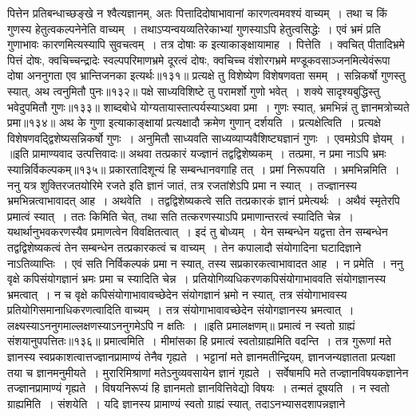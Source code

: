 पित्तेन प्रतिबन्धाच्छङ्खे न श्वैत्यज्ञानम्, अतः पित्तादिदोषाभावानां कारणत्वमवश्यं वाच्यम्~। तथा च किं गुणस्य हेतुत्वकल्पनेनेति वाच्यम्~। तथाऽप्यन्वयव्यतिरेकाभ्यां
गुणस्याऽपि हेतुत्वसिद्धेः~। एवं भ्रमं प्रति गुणाभावः कारणमित्यस्यापि सुवचत्वम्~।
तत्र दोषाः क इत्याकाङ्क्षायामाह~। पित्तेति~। क्वचित् पीतादिभ्रमे पित्तं दोषः, क्वचिच्चन्द्रादेः स्वल्पपरिमाणभ्रमे दूरत्वं दोषः, क्वचिच्च वंशोरगभ्रमे मण्डूकवसाञ्जनमित्येवंरूपा
दोषा अननुगता एव भ्रान्तिजनका इत्यर्थः॥१३१॥
प्रत्यक्षे तु विशेष्येण विशेषणवता समम्~।
सन्निकर्षो गुणस्तु स्यात्, अथ त्वनुमितौ पुनः॥१३२॥
पक्षे साध्यविशिष्टे तु परामर्शो गुणो भवेत्~।
शक्ये सादृश्यबुद्धिस्तु भवेदुपमितौ गुणः॥१३३॥
शाब्दबोधे योग्यतायास्तात्पर्यस्याऽथवा प्रमा~।
गुणः स्यात्, भ्रमभिन्नं तु ज्ञानमत्रोच्यते प्रमा॥१३४॥
अथ के गुणा इत्याकाङ्क्षायां प्रत्यक्षादौ क्रमेण गुणान् दर्शयति~। प्रत्यक्षेत्विति~। प्रत्यक्षे विशेषणवद्द्विशेष्यसन्निकर्षो गुणः~।
अनुमितौ साध्यवति साध्यव्याप्यवैशिष्ट्यज्ञानं गुणः~। एवमग्रेऽपि ज्ञेयम्~।
॥इति प्रामाण्यवाद उत्पत्तिवादः॥
अथवा तत्प्रकारं यज्ज्ञानं तद्वद्विशेष्यकम्~।
तत्प्रमा, न प्रमा नाऽपि भ्रमः स्यान्निर्विकल्पकम्॥१३५॥
प्रकारतादिशून्यं हि सम्बन्धानवगाहि तत्~।
प्रमां निरूपयति~। भ्रमभिन्नमिति~।
ननु यत्र शुक्तिरजतयोरिमे रजते इति ज्ञानं जातं, तत्र रजतांशेऽपि प्रमा न स्यात्~। तज्ज्ञानस्य भ्रमभिन्नत्वाभावादत् आह~। अथवेति~। तद्वद्विशेष्यकत्वे सति तत्प्रकारकं
ज्ञानं प्रमेत्यर्थः~। अथैवं स्मृतेरपि प्रमात्वं स्यात्~। ततः किमिति चेत्, तथा सति तत्करणस्याऽपि प्रमाणान्तरत्वं स्यादिति चेन्न~। यथार्थानुभवकरणस्यैव प्रमाणत्वेन
विवक्षितत्वात्~।
इदं तु बोध्यम्~। येन सम्बन्धेन यद्वत्ता तेन सम्बन्धेन तद्वद्विशेष्यकत्वं तेन सम्बन्धेन तत्प्रकारकत्वं च वाच्यम्~। तेन कपालादौ संयोगादिना घटादिज्ञाने
नाऽतिव्याप्तिः~।
एवं सति निर्विकल्पकं प्रमा न स्यात्, तस्य सप्रकारकत्वाभावादत आह~। न प्रमेति~। ननु वृक्षे कपिसंयोगज्ञानं भ्रमः प्रमा च स्यादिति चेन्न~।
प्रतियोगिव्यधिकरणकपिसंयोगाभाववति संयोगज्ञानस्य भ्रमत्वात्~। न च वृक्षे कपिसंयोगाभावावच्छेदेन संयोगज्ञानं भ्रमो न स्यात्, तत्र संयोगाभावस्य प्रतियोगिसमानाधिकरणत्वादिति
वाच्यम्~। तत्र संयोगाभावावच्छेदेन संयोगज्ञानस्य भ्रमत्वात्~। लक्ष्यस्याऽननुगमाल्लक्षणस्याऽननुगमेऽपि न क्षतिः~।
॥इति प्रमालक्षणम्॥
प्रमात्वं न स्वतो ग्राह्यं संशयानुपपत्तितः॥१३६॥
प्रमात्वमिति~। मीमांसका हि प्रमात्वं स्वतोग्राह्यमिति वदन्ति~। तत्र गुरूणां मते ज्ञानस्य स्वप्रकाशत्वात्तज्ज्ञानप्रामाण्यं तेनैव गृह्यते~। भट्टानां मते ज्ञानमतीन्द्रियम्,
ज्ञानजन्यज्ञातता प्रत्यक्षा तया च ज्ञानमनुमीयते~। मुरारिमिश्राणां मतेऽनुव्यवसायेन ज्ञानं गृह्यते~। सर्वेषामपि मते तज्ज्ञानविषयकज्ञानेन तज्ज्ञानप्रामाण्यं गृह्यते~।
विषयनिरूप्यं हि ज्ञानमतो ज्ञानवित्तिवेद्यो विषयः~। तन्मतं दूषयति~। न स्वतो ग्राह्यमिति~। संशयेति~। यदि ज्ञानस्य प्रामाण्यं स्वतो ग्राह्यं स्यात्, तदाऽनभ्यासदशापन्नज्ञाने
